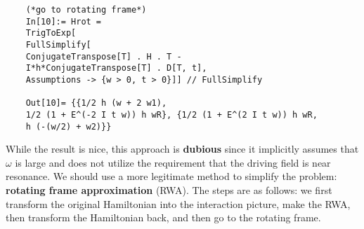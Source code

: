 \documentclass{article}
\theoremstyle{definition}
\begin{document}
\begin{enumerate}[label=\alph*)]
\begin{lstlisting}
	(*go to rotating frame*)
	In[10]:= Hrot = 
	TrigToExp[
	FullSimplify[
	ConjugateTranspose[T] . H . T - 
	I*h*ConjugateTranspose[T] . D[T, t], 
	Assumptions -> {w > 0, t > 0}]] // FullSimplify
	
	Out[10]= {{1/2 h (w + 2 w1), 
	1/2 (1 + E^(-2 I t w)) h wR}, {1/2 (1 + E^(2 I t w)) h wR, 
	h (-(w/2) + w2)}}
	\end{lstlisting}
	
	
	
	
	While the result is nice, this approach is \textbf{dubious} since it implicitly assumes that $\omega$ is large and does not utilize the requirement that the driving field is near resonance. We should use a more legitimate method to simplify the problem:  \textbf{rotating frame approximation} (RWA).  The steps are as follows: we first transform the original Hamiltonian into the interaction picture, make the RWA, then transform the Hamiltonian back, and then go to the rotating frame. \\
	

\end{enumerate}
\end{document}
